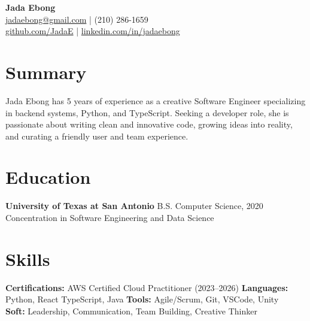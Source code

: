 \documentclass[10pt]{article}
\begin{document}
\begin{center}
  \textbf{\Large Jada Ebong} \\[0.2em]
  \href{mailto:jadaebong@gmail.com}{jadaebong@gmail.com} \quad | \quad (210) 286-1659 \\[0.2em]
  \href{https://github.com/JadaE}{github.com/JadaE} \quad | \quad \href{https://linkedin.com/in/jadaebong}{linkedin.com/in/jadaebong}
\end{center}

\section{Summary}
Jada Ebong has 5 years of experience as a creative Software Engineer specializing in backend systems, Python, and TypeScript. Seeking a developer role, she is passionate about writing clean and innovative code, growing ideas into reality, and curating a friendly user and team experience.

\section*{Education}
\textbf{University of Texas at San Antonio} \hfill B.S. Computer Science, 2020\\
Concentration in Software Engineering and Data Science

\section*{Skills}
\textbf{Certifications:} AWS Certified Cloud Practitioner (2023--2026) \quad
\textbf{Languages:} Python, React TypeScript, Java \quad
\textbf{Tools:} Agile/Scrum, Git, VSCode, Unity \\
\textbf{Soft:} Leadership, Communication, Team Building, Creative Thinker
\end{document}
